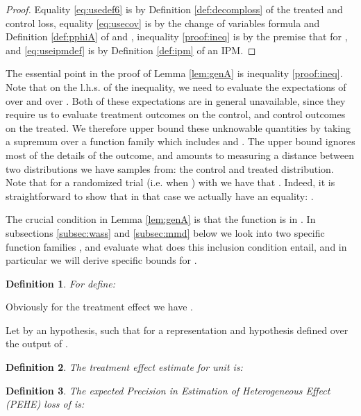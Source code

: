 \documentclass{article}
\newtheorem{thmappdef}{Definition}
\begin{document}
\begin{proof}
\allowdisplaybreaks

Equality \eqref{eq:usedef6} is by Definition \ref{def:decomploss} of the treated and control loss, equality \eqref{eq:usecov} is by the change of variables formula and Definition \ref{def:pphiA} of  and , inequality \eqref{proof:ineq} is by the premise that  for , and \eqref{eq:useipmdef} is by Definition \ref{def:ipm} of an IPM.
\end{proof}


The essential point in the proof of Lemma \ref{lem:genA} is inequality \ref{proof:ineq}. Note that on the l.h.s. of the inequality, we need to evaluate the expectations of  over  and  over . Both of these expectations are in general unavailable, since they require us to evaluate treatment outcomes on the control, and control outcomes on the treated. We therefore upper bound these unknowable quantities by taking a supremum over a function family which includes  and . The upper bound ignores most of the details of the outcome, and amounts to measuring a distance between two distributions we have samples from: the control and treated distribution. Note that for a randomized trial (i.e. when ) with we have that . Indeed, it is straightforward to show that in that case we actually have an equality: .


The crucial condition in Lemma \ref{lem:genA} is that the function  is in . In subsections \ref{subsec:wass} and \ref{subsec:mmd} below we look into two specific function families , and evaluate what does this inclusion condition entail, and in particular we will derive specific bounds for .



\begin{thmappdef}\label{def:m}
For  define:

\end{thmappdef}
Obviously for the treatment effect  we have .


Let  by an hypothesis, such that  for a representation  and hypothesis  defined over the output of .
\begin{thmappdef}\label{def:inditeerrA}
The treatment effect estimate for unit  is:

\end{thmappdef}


\begin{thmappdef}
 The expected Precision in Estimation of Heterogeneous Effect (PEHE) loss of  is:

\end{thmappdef}
\end{document}
